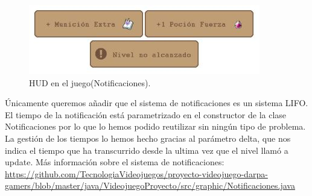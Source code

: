\begin{figure}[!htb]
  \centering
    \includegraphics{./img/8.JPG}
    \caption{HUD en el juego(Notificaciones).}
  \label{fig:yo}
\end{figure}
Únicamente queremos añadir que el sistema de notificaciones es un sistema LIFO. El tiempo de la notificación está parametrizado en el constructor de la clase Notificaciones por lo que lo hemos podido reutilizar sin ningún tipo de problema. La gestión de los tiempos lo hemos hecho gracias al parámetro delta, que nos indica el tiempo que ha transcurrido desde la ultima vez que el nivel llamó a update.\newline
\newline
Más información sobre el sistema de notificaciones:\newline
\url{https://github.com/TecnologiaVideojuegos/proyecto-videojuego-darpa-gamers/blob/master/java/VideojuegoProyecto/src/graphic/Notificaciones.java}
\newpage
